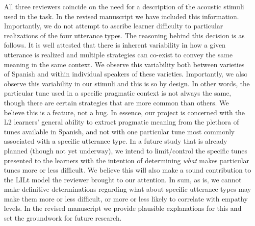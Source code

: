 \documentclass[]{article}
\newcommand{\TaskEstimationBox}[2]{%
\ifoptiondraft{\parbox{1.0\linewidth}{\hfill \hfill {\colorbox{#2}{\color{White} \textbf{#1}}}}}%
{}%
}
\def\Done {\TaskEstimationBox{Done}{Blue}}
\def\Easy {\TaskEstimationBox{Feasible}{ForestGreen}}
\begin{document}
All three reviewers coincide on the need for a description of the acoustic stimuli used in the task.
In the revised manuscript we have included this information.
Importantly, we do not attempt to ascribe learner difficulty to particular realizations of the four utterance types.
The reasoning behind this decision is as follows.
It is well attested that there is inherent variability in how a given utterance is realized and multiple strategies can co-exist to convey the same meaning in the same context.
We observe this variability both between varieties of Spanish and within individual speakers of these varieties.
Importantly, we also observe this variability in our stimuli and this is so by design.
In other words, the particular tune used in a specific pragmatic context is not always the same, though there are certain strategies that are more common than others.
We believe this is a feature, not a bug.
In essence, our project is concerned with the L2 learners' general ability to extract pragmatic meaning from the plethora of tunes available in Spanish, and not with one particular tune most commonly associated with a specific utterance type.
In a future study that is already planned (though not yet underway), we intend to limit/control the specific tunes presented to the learners with the intention of determining \emph{what} makes particular tunes more or less difficult.
We believe this will also make a sound contribution to the LILt model the reviewer brought to our attention.
In sum, as is, we cannot make definitive determinations regarding what about specific utterance types may make them more or less difficult, or more or less likely to correlate with empathy levels.
In the revised manuscript we provide plausible explanations for this and set the groundwork for future research.

\Done
\Easy

\end{document}
